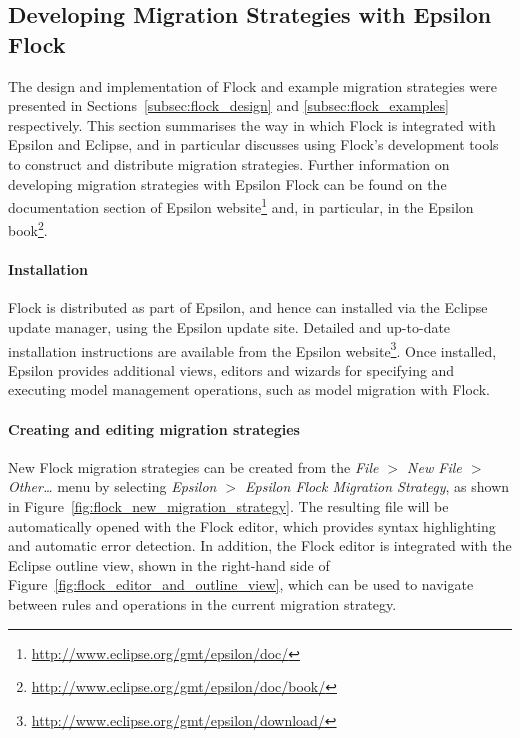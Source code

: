 \subsection{Developing Migration Strategies with Epsilon Flock}
\label{subsec:flock_guide}
The design and implementation of Flock and example migration strategies were presented in Sections~\ref{subsec:flock_design} and \ref{subsec:flock_examples} respectively. This section summarises the way in which Flock is integrated with Epsilon and Eclipse, and in particular discusses using Flock's development tools to construct and distribute migration strategies. Further information on developing migration strategies with Epsilon Flock can be found on the documentation section of Epsilon website\footnote{\url{http://www.eclipse.org/gmt/epsilon/doc/}} and, in particular, in the Epsilon book\footnote{\url{http://www.eclipse.org/gmt/epsilon/doc/book/}}.

\paragraph{Installation} Flock is distributed as part of Epsilon, and hence can installed via the Eclipse update manager, using the Epsilon update site. Detailed and up-to-date installation instructions are available from the Epsilon website\footnote{\url{http://www.eclipse.org/gmt/epsilon/download/}}. Once installed, Epsilon provides additional views, editors and wizards for specifying and executing model management operations, such as model migration with Flock.

\paragraph{Creating and editing migration strategies} New Flock migration strategies can be created from the \emph{File $>$ New File $>$ Other\ldots} menu by selecting \emph{Epsilon $>$ Epsilon Flock Migration Strategy}, as shown in Figure~\ref{fig:flock_new_migration_strategy}. The resulting file will be automatically opened with the Flock editor, which provides syntax highlighting and automatic error detection. In addition, the Flock editor is integrated with the Eclipse outline view, shown in the right-hand side of Figure~\ref{fig:flock_editor_and_outline_view}, which can be used to navigate between rules and operations in the current migration strategy.

